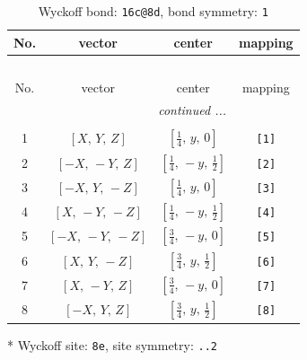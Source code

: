 \documentclass[fleqn,8pt]{jsarticle}
\begin{document}
\renewcommand{\arraystretch}{1.2}
\begin{longtable}{cccc}
\caption{Wyckoff bond: {\tt 16c@8d}, bond symmetry: {\tt 1}}
 \\
 \hline \hline
No. & vector & center & mapping \\ \hline \endfirsthead

\multicolumn{3}{l}{\tablename\ \thetable{}} \\
 \hline \hline
No. & vector & center & mapping \\ \hline \endhead

 \hline \hline
\multicolumn{3}{r}{\footnotesize\it continued ...} \\ \endfoot

 \hline \hline
\multicolumn{3}{r}{} \\ \endlastfoot

1 & $\left[ X,\, Y,\, Z \right]$ & $\left[ \frac{1}{4},\, y,\, 0 \right]$ & {\tt [1]} \\ \hline
2 & $\left[ - X,\, - Y,\, Z \right]$ & $\left[ \frac{1}{4},\, - y,\, \frac{1}{2} \right]$ & {\tt [2]} \\ \hline
3 & $\left[ - X,\, Y,\, - Z \right]$ & $\left[ \frac{1}{4},\, y,\, 0 \right]$ & {\tt [3]} \\ \hline
4 & $\left[ X,\, - Y,\, - Z \right]$ & $\left[ \frac{1}{4},\, - y,\, \frac{1}{2} \right]$ & {\tt [4]} \\ \hline
5 & $\left[ - X,\, - Y,\, - Z \right]$ & $\left[ \frac{3}{4},\, - y,\, 0 \right]$ & {\tt [5]} \\ \hline
6 & $\left[ X,\, Y,\, - Z \right]$ & $\left[ \frac{3}{4},\, y,\, \frac{1}{2} \right]$ & {\tt [6]} \\ \hline
7 & $\left[ X,\, - Y,\, Z \right]$ & $\left[ \frac{3}{4},\, - y,\, 0 \right]$ & {\tt [7]} \\ \hline
8 & $\left[ - X,\, Y,\, Z \right]$ & $\left[ \frac{3}{4},\, y,\, \frac{1}{2} \right]$ & {\tt [8]} \\
\end{longtable}
* Wyckoff site: {\tt 8e}, site symmetry: {\tt ..2}
\renewcommand{\arraystretch}{1.2}
\end{document}
